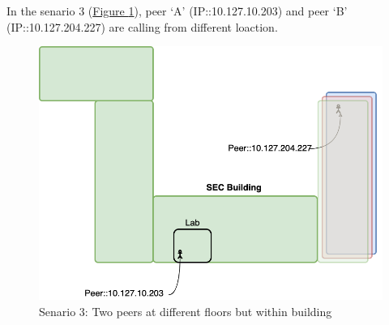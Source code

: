 	In the senario 3 (\hyperref[fig:scene-3]{Figure \ref{fig:scene-3}}), peer `A' (IP::10.127.10.203) and peer `B' (IP::10.127.204.227) are calling from different loaction.
	\begin{figure}[hb]
		\begin{minipage}{\textwidth}
			\includegraphics[scale=0.29]{Images/experiment/senarios/diff_floor.drawio.png}
		\end{minipage}
		\caption{Senario 3: Two peers at different floors but within building}
		\label{fig:scene-3}
	\end{figure}

